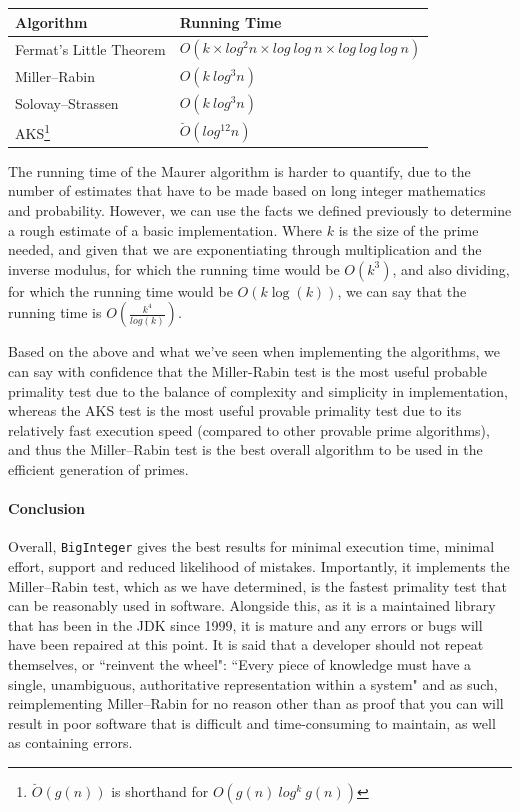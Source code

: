       \begin{center}
        \begin{tabular}{ | l | l |}
          \hline
          \textbf{Algorithm} & \textbf{Running Time}  \\ \hline
          Fermat's Little Theorem & $O(k \times log^2n \times log \ log \ n \times log \ log \ log \ n)$ \\ \hline
          Miller--Rabin & $O(k \ log^3n)$ \\ \hline
          Solovay--Strassen & $O(k \ log^3n)$ \\ \hline
          AKS\footnote{$\breve{O}(g(n))$ is shorthand for $O(g(n) \ log^k \ g(n))$} & $\breve{O}(log^{12}n)$ \\ \hline
        \end{tabular}
      \end{center}
      
      The running time of the Maurer algorithm is harder to quantify, due to the number of estimates that have to be made based on long integer mathematics and probability. However, we can use the facts we defined previously to determine a rough estimate of a basic implementation. Where $k$ is the size of the prime needed, and given that we are exponentiating through multiplication and the inverse modulus, for which the running time would be $O(k^3)$, and also dividing, for which the running time would be $O(k\log(k))$, we can say that the running time is $O(\frac{k^4}{log(k)})$\cite{Schwarz:2007aa}.
      
    Based on the above and what we've seen when implementing the algorithms, we can say with confidence that the Miller-Rabin test is the most useful probable primality test due to the balance of complexity  and simplicity in implementation, whereas the AKS test is the most useful provable primality test due to its relatively fast execution speed (compared to other provable prime algorithms), and thus the Miller--Rabin test is the best overall algorithm to be used in the efficient generation of primes.
    
      \paragraph{Conclusion}
      
      Overall, \verb!BigInteger! gives the best results for minimal execution time, minimal effort, support and reduced likelihood of mistakes. Importantly, it implements the Miller--Rabin test, which as we have determined, is the fastest primality test that can be reasonably used in software. Alongside this, as it is a maintained library that has been in the JDK since 1999, it is mature and any errors or bugs will have been repaired at this point. It is said that a developer should not repeat themselves, or ``reinvent the wheel": ``Every piece of knowledge must have a single, unambiguous, authoritative representation within a system"\cite{Hunt:1999aa} and as such, reimplementing Miller--Rabin for no reason other than as proof that you can will result in poor software that is difficult and time-consuming to maintain, as well as containing errors.
    
